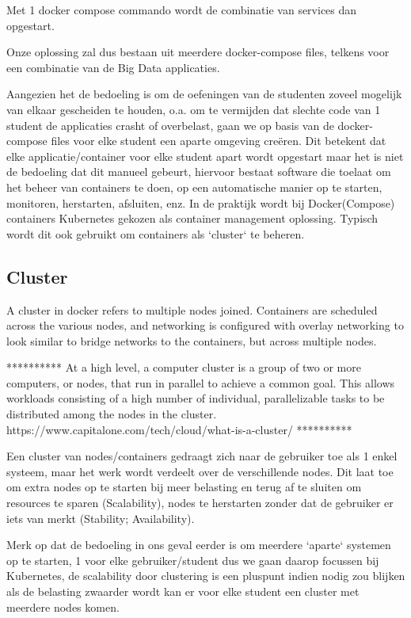 Met 1 docker compose commando wordt de combinatie van services dan opgestart.

Onze oplossing zal dus bestaan uit meerdere docker-compose files, telkens voor een combinatie van de Big Data applicaties.

Aangezien het de bedoeling is om de oefeningen van de studenten zoveel mogelijk van elkaar gescheiden te houden, o.a. om te vermijden dat slechte code van 1 student de applicaties crasht of overbelast, gaan we op basis van de docker-compose files voor elke student een aparte omgeving creëren. Dit betekent dat elke applicatie/container voor elke student apart wordt opgestart maar het is niet de bedoeling dat dit manueel gebeurt, hiervoor bestaat software die toelaat om het beheer van containers te doen, op een automatische manier op te starten, monitoren, herstarten, afsluiten, enz.
In de praktijk wordt bij Docker(Compose) containers Kubernetes gekozen als container management oplossing. Typisch wordt dit ook gebruikt om containers als `cluster` te beheren.

\subsection{Cluster}
A cluster in docker refers to multiple nodes joined. Containers are scheduled across the various nodes, and networking is configured with overlay networking to look similar to bridge networks to the containers, but across multiple nodes.\autocite{BMitch2019}

**********
At a high level, a computer cluster is a group of two or more computers, or nodes, that run in parallel to achieve a common goal. This allows workloads consisting of a high number of individual, parallelizable tasks to be distributed among the nodes in the cluster.
https://www.capitalone.com/tech/cloud/what-is-a-cluster/
**********

Een cluster van nodes/containers gedraagt zich naar de gebruiker toe als 1 enkel systeem, maar het werk wordt verdeelt over de verschillende nodes. Dit laat toe om extra nodes op te starten bij meer belasting en terug af te sluiten om resources te sparen (Scalability), nodes te herstarten zonder dat de gebruiker er iets van merkt (Stability; Availability).

Merk op dat de bedoeling in ons geval eerder is om meerdere `aparte` systemen op te starten, 1 voor elke gebruiker/student dus we gaan daarop focussen bij Kubernetes, de scalability door clustering is een pluspunt indien nodig zou blijken als de belasting zwaarder wordt kan er voor elke student een cluster met meerdere nodes komen.

